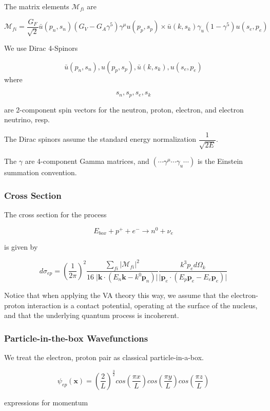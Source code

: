 \documentclass[11pt]{amsart}
\begin{document}
The matrix elements $\mathcal{M}_{fi}$ are

$$\mathcal{M}_{fi}=\dfrac{G_{F}}{\sqrt{2}}\bar{u}(p_{n},s_{n})(G_{V}-G_{A}\gamma^{5})\gamma^{\mu}u(p_{p},s_{p})\times\bar{u}(k,s_{k})\gamma_{u}(1-\gamma^{5})u(s_{e},p_{e})$$


We use Dirac 4-Spinors

$$\bar{u}(p_{n},s_{n}),u(p_{p},s_{p}),\bar{u}(k,s_{k}),u(s_{e},p_{e})$$
where

$$s_{n}, s_{p},s_{e},s_{k}$$ 

are 2-component spin vectors for the neutron, proton, electron, and electron neutrino, resp. 

The Dirac spinors assume the standard energy normalization $\dfrac{1}{\sqrt{2E}}$.

The $\gamma$ are 4-component Gamma matrices, and  $(\cdots\gamma^{\mu}\cdots\gamma_{u}\cdots)$ is the Einstein summation convention.


\subsubsection{Cross Section}

The cross section for the process

$$E_{box}+p^{+}+e^{-}\rightarrow n^{0}+\nu_{e}$$

is given by 

$$d\sigma_{ep}=\left(\dfrac{1}{2\pi}\right)^{2}\dfrac{\sum_{fi}\big\vert\mathcal{M}_{fi}\big\vert^{2}}{16\;\big\vert\mathbf{k}\cdot(E{_n}\mathbf{k}-k^{0}\mathbf{p}_{n})\big\vert}\dfrac{k^{3}p_{e}d\Omega_{k}}{\big\vert\mathbf{p}_{e}\cdot(E_{p}\mathbf{p}_{e}-E_{e}\mathbf{p}_{e})\big\vert}$$

Notice that when applying the VA theory this way, we assume that the electron-proton interaction is a contact potential, operating at the surface of the nucleus, and that the underlying quantum process is incoherent.  

\subsubsection{Particle-in-the-box Wavefunctions}


We treat the electron, proton pair as classical particle-in-a-box.

$$\psi_{ep}(\mathbf{x})=\left(\dfrac{2}{L}\right)^{\frac{3}{2}}cos\left(\dfrac{\pi x}{L}\right)cos\left(\dfrac{\pi y}{L}\right)cos\left(\dfrac{\pi z}{L}\right)$$

expressions for momentum
\end{document}
